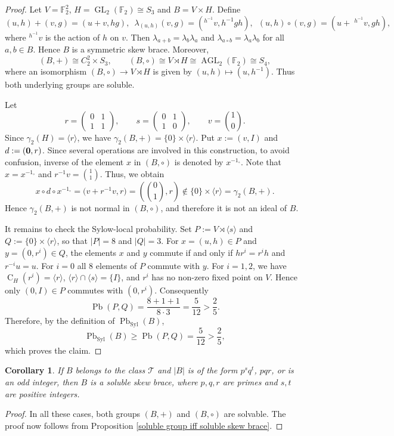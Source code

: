 \documentclass[10pt,a4paper]{amsart}
\numberwithin{equation}{section}
\newtheorem{cor}[equation]{Corollary}
\newcommand{\C}{\operatorname{C} }
\newcommand{\Pb}{\operatorname{Pb} }
\newcommand{\Syl}{\operatorname{Syl} }
\begin{document}
\begin{proof}
Let $V=\mathbb F_2^2$, $H=\operatorname{GL}_2(\mathbb F_2)\cong S_3$ and $B=V\times H$. Define
$$
(u,h)+(v,g)=(u+v,hg),\,\,\,
\lambda_{(u,h)}(v,g)=(^{h^{-1}}v,h^{-1}gh),\,\,\,
(u,h)\circ(v,g)=(u+ \;^{h^{-1}}v,gh),
$$
where $^{h^{-1}}v$ is the action of $h$ on $v$.
Then $\lambda_{a+b}=\lambda_b\lambda_a$ and $\lambda_{a\circ b}=\lambda_a\lambda_b$ for all $a,b\in B$.  Hence $B$ is a symmetric skew brace. Moreover,
$$
(B,+)\cong C_2^2\times S_3,\qquad
(B,\circ)\cong V\rtimes H\cong \operatorname{AGL}_2(\mathbb F_2)\cong S_4,
$$
where an isomorphism $(B,\circ)\to V\rtimes H$ is given by $(u,h)\mapsto(u,h^{-1})$. Thus both underlying groups are soluble.

Let
$$
r=\begin{pmatrix}0&1\\1&1\end{pmatrix},\qquad
s=\begin{pmatrix}0&1\\1&0\end{pmatrix},\qquad
v=\binom10.
$$
Since $\gamma_2(H)=\langle r\rangle$, we have $\gamma_2(B,+) = \{0\}\times\langle r\rangle$. Put $x :=(v,I)$ and $d:=({\bf 0},r)$. Since several operations are involved in this construction, to avoid confusion, inverse of the element $x$ in $(B, \circ)$ is denoted by $x^{-1_{\circ}}$. Note that  $x = x^{-1_{\circ}}$ and  $r^{-1}v=\binom11$. Thus, we obtain
$$
x\circ d\circ x^{-1_\circ}
 =\bigl(v+r^{-1}v,r\bigr)
 =\left(\binom01,r\right)\notin \{0\}\times\langle r\rangle= \gamma_2(B,+).
$$
Hence $\gamma_2(B,+)$ is not normal in $(B,\circ)$, and therefore it is not an ideal of $B$.

It remains to check the Sylow-local probability. Set $P:=V\rtimes\langle s\rangle$ and $Q:=\{0\}\times\langle r\rangle$, so that $|P|=8$ and $|Q|=3$. For $x=(u,h)\in P$ and $y=(0,r^i)\in Q$, the elements $x$ and $y$ commute if and only if $hr^i=r^ih$ and $r^{-i}u=u$. For $i=0$ all $8$ elements of $P$ commute with $y$. For $i=1,2$, we have $\C_H(r^i)=\langle r\rangle$, $\langle r\rangle\cap\langle s\rangle=\{I\}$, and $r^i$ has no non-zero fixed point on $V$. Hence only $(0,I)\in P$ commutes with $(0,r^i)$. Consequently
$$
\Pb(P,Q)=\frac{8+1+1}{8\cdot3}=\frac5{12}>\frac25.
$$
Therefore, by the definition of $\Pb_{\Syl}(B)$,
$$
\Pb_{\Syl}(B)\geqslant\Pb(P,Q)=\frac5{12}>\frac25,
$$
which proves the claim.
\end{proof}



\begin{cor}
      If $B$ belongs to the class $\mathcal{T}$ and $|B|$ is of the form $p^sq^t$, $pqr$, or is an odd integer, then $B$ is a soluble skew brace, where $p,q,r$ are primes and $s, t$ are positive integers.  
\end{cor}
\begin{proof}
    In all these cases, both groups $(B,+)$ and $(B,\circ)$ are solvable. The proof now follows from Proposition \ref{soluble group iff soluble skew brace}.
\end{proof}
\end{document}
